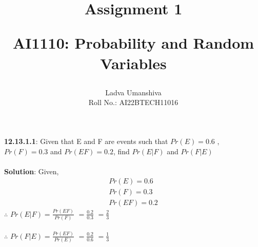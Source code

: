 \documentclass[12pt]{article}
\title{ \textbf{Assignment 1}  \\ \begin{normalsize} \textbf{AI1110}: Probability and Random Variables \end{normalsize}}
\author{Ladva Umanshiva \\ Roll No.: AI22BTECH11016}
\date{}
\begin{document}
\maketitle
\textbf{12.13.1.1}: Given that E and F are events such that $Pr(E) = 0.6$ , $Pr(F) = 0.3$ and $Pr(EF) = 0.2$, find $Pr(E|F)$ and $Pr(F|E)$ \\\\
\textbf{Solution}: Given, 
			\\ \begin{align} Pr(E) = 0.6 \\ Pr(F) = 0.3 \\ Pr(EF) = 0.2 \end{align} 
			$\therefore$			
			$ Pr(E|F) = \frac{Pr(EF)}{Pr(F)} $ 
			$	 = \frac{0.2}{0.3} $ 
			$        = \frac{2}{3} $ \\\\
			$\therefore$
			$ Pr(F|E) = \frac{Pr(EF)}{Pr(E)} $
			$        = \frac{0.2}{0.6} $
			$        = \frac{1}{3} $
\end{document}
